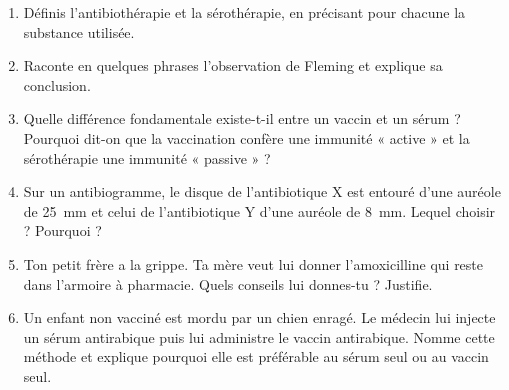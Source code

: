 \documentclass[11pt]{article}
\begin{document}
\begin{exercice}
\begin{enumerate}
\item Définis l'antibiothérapie et la sérothérapie, en précisant pour chacune la substance utilisée.
\item Raconte en quelques phrases l'observation de Fleming et explique sa conclusion.
\item Quelle différence fondamentale existe-t-il entre un vaccin et un sérum ? Pourquoi dit-on que la vaccination confère une immunité « active » et la sérothérapie une immunité « passive » ?
\item Sur un antibiogramme, le disque de l'antibiotique X est entouré d'une auréole de \SI{25}{mm} et celui de l'antibiotique Y d'une auréole de \SI{8}{mm}. Lequel choisir ? Pourquoi ?
\item Ton petit frère a la grippe. Ta mère veut lui donner l'amoxicilline qui reste dans l'armoire à pharmacie. Quels conseils lui donnes-tu ? Justifie.
\item Un enfant non vacciné est mordu par un chien enragé. Le médecin lui injecte un sérum antirabique puis lui administre le vaccin antirabique. Nomme cette méthode et explique pourquoi elle est préférable au sérum seul ou au vaccin seul.
\end{enumerate}
\end{exercice}
\end{document}
